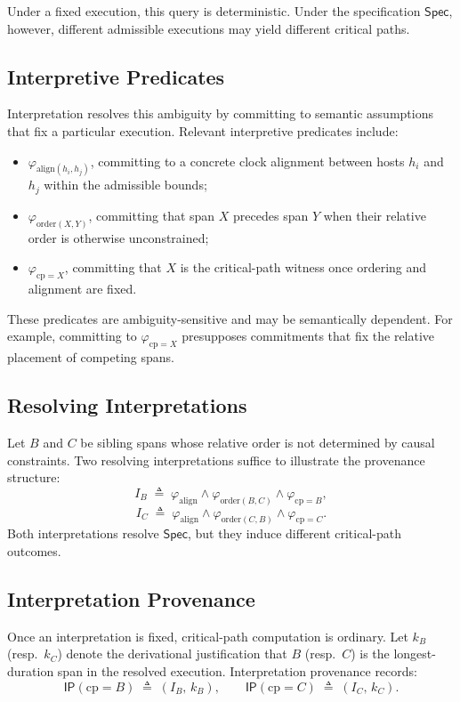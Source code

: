 \documentclass[acmsmall,nonacm]{acmart}
\theoremstyle{remark}
\numberwithin{definition}{section}
\numberwithin{theorem}{section}
\numberwithin{lemma}{section}
\numberwithin{corollary}{section}
\numberwithin{remark}{section}
\numberwithin{example}{section}
\numberwithin{observation}{section}
\numberwithin{assumption}{section}
\newcommand{\Spec}{\mathsf{Spec}}
\begin{document}
Under a fixed execution, this query is deterministic.
Under the specification $\Spec$, however, different admissible executions may
yield different critical paths.

\subsection{Interpretive Predicates}

Interpretation resolves this ambiguity by committing to semantic assumptions that
fix a particular execution.
Relevant interpretive predicates include:
\begin{itemize}
  \item $\varphi_{\mathrm{align}(h_i,h_j)}$, committing to a concrete clock
        alignment between hosts $h_i$ and $h_j$ within the admissible bounds;
  \item $\varphi_{\mathrm{order}(X,Y)}$, committing that span $X$ precedes span
        $Y$ when their relative order is otherwise unconstrained;
  \item $\varphi_{\mathrm{cp}=X}$, committing that $X$ is the critical-path
        witness once ordering and alignment are fixed.
\end{itemize}

These predicates are ambiguity-sensitive and may be semantically dependent.
For example, committing to $\varphi_{\mathrm{cp}=X}$ presupposes commitments that
fix the relative placement of competing spans.

\subsection{Resolving Interpretations}

Let $B$ and $C$ be sibling spans whose relative order is not determined by causal
constraints.
Two resolving interpretations suffice to illustrate the provenance structure:
\[
  I_B \;\triangleq\;
  \varphi_{\mathrm{align}} \wedge \varphi_{\mathrm{order}(B,C)} \wedge
  \varphi_{\mathrm{cp}=B},
\]
\[
  I_C \;\triangleq\;
  \varphi_{\mathrm{align}} \wedge \varphi_{\mathrm{order}(C,B)} \wedge
  \varphi_{\mathrm{cp}=C}.
\]
Both interpretations resolve $\Spec$, but they induce different critical-path
outcomes.

\subsection{Interpretation Provenance}

Once an interpretation is fixed, critical-path computation is ordinary.
Let $k_B$ (resp.\ $k_C$) denote the derivational justification that $B$ (resp.\ $C$)
is the longest-duration span in the resolved execution.
Interpretation provenance records:
\[
  \mathsf{IP}(\mathrm{cp}=B) \;\triangleq\; (I_B,\, k_B),
  \qquad
  \mathsf{IP}(\mathrm{cp}=C) \;\triangleq\; (I_C,\, k_C) .
\]
\end{document}
